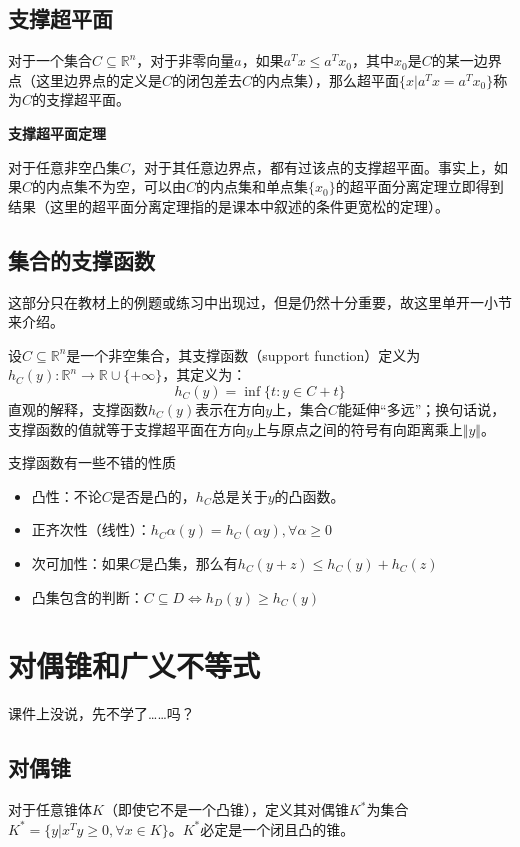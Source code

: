 \documentclass[12pt,a4paper]{book}
\begin{document}
\subsection{支撑超平面}

对于一个集合$C\subseteq\mathbb{R}^n$，对于非零向量$a$，如果$a^Tx\leq a^Tx_0$，其中$x_0$是$C$的某一边界点（这里边界点的定义是$C$的闭包差去$C$的内点集），那么超平面$\{x|a^Tx=a^Tx_0\}$称为$C$的支撑超平面。

\textbf{支撑超平面定理}

对于任意非空凸集$C$，对于其任意边界点，都有过该点的支撑超平面。事实上，如果$C$的内点集不为空，可以由$C$的内点集和单点集$\{x_0\}$的超平面分离定理立即得到结果（这里的超平面分离定理指的是课本中叙述的条件更宽松的定理）。

\subsection{集合的支撑函数}

这部分只在教材上的例题或练习中出现过，但是仍然十分重要，故这里单开一小节来介绍。

设$C\subseteq\mathbb{R}^n$是一个非空集合，其支撑函数（support function）定义为$h_C(y):\mathbb{R}^n\to\mathbb{R}\cup \{+\infty\}$，其定义为：
\begin{equation}
h_C(y)=\inf\{t:y\in C+t\}
\end{equation}
直观的解释，支撑函数$h_C(y)$表示在方向$y$上，集合$C$能延伸“多远”；换句话说，支撑函数的值就等于支撑超平面在方向$y$上与原点之间的符号有向距离乘上$\Vert y \Vert $。

支撑函数有一些不错的性质
\begin{itemize}
    \item 凸性：不论$C$是否是凸的，$h_C$总是关于$y$的凸函数。
    \item 正齐次性（线性）：$h_C\alpha (y) = h_C(\alpha y) ,\forall \alpha \geq 0$
    \item 次可加性：如果$C$是凸集，那么有$h_C(y+z) \leq h_C(y) + h_C(z)$
    \item 凸集包含的判断：$C\subseteq D\Longleftrightarrow h_D(y) \geq h_C(y)$
\end{itemize}

\section{对偶锥和广义不等式}

课件上没说，先不学了……吗？

\subsection{对偶锥}
对于任意锥体$K$（即使它不是一个凸锥），定义其对偶锥$K^*$为集合$K^*=\{y|x^Ty\geq 0 ,\forall x\in K\}$。$K^*$必定是一个闭且凸的锥。
\end{document}
